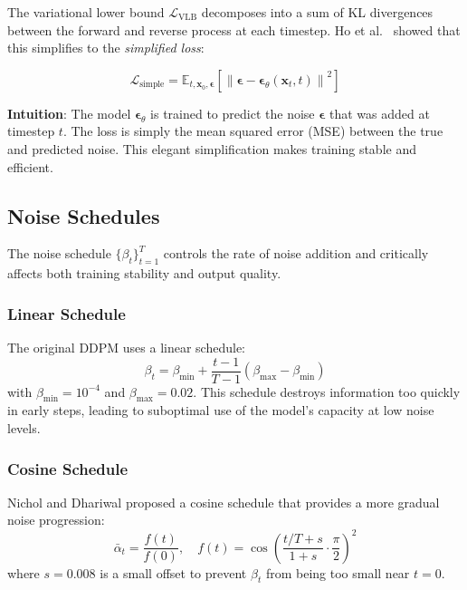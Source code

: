 \documentclass[conference]{IEEEtran}
\begin{document}
The variational lower bound $\mathcal{L}_{\text{VLB}}$ decomposes into a sum of KL divergences between the forward and reverse process at each timestep. Ho et al.\ \cite{ho2020ddpm} showed that this simplifies to the \textit{simplified loss}:

\begin{equation}
    \mathcal{L}_{\text{simple}} = \mathbb{E}_{t, \mathbf{x}_0, \boldsymbol{\epsilon}}\left[\left\| \boldsymbol{\epsilon} - \boldsymbol{\epsilon}_\theta(\mathbf{x}_t, t) \right\|^2\right]
    \label{eq:loss_simple}
\end{equation}

\textbf{Intuition}: The model $\boldsymbol{\epsilon}_\theta$ is trained to predict the noise $\boldsymbol{\epsilon}$ that was added at timestep $t$. The loss is simply the mean squared error (MSE) between the true and predicted noise. This elegant simplification makes training stable and efficient.

\subsection{Noise Schedules}

The noise schedule $\{\beta_t\}_{t=1}^T$ controls the rate of noise addition and critically affects both training stability and output quality.

\subsubsection{Linear Schedule}
The original DDPM \cite{ho2020ddpm} uses a linear schedule:
\begin{equation}
    \beta_t = \beta_{\min} + \frac{t - 1}{T - 1}(\beta_{\max} - \beta_{\min})
    \label{eq:linear_schedule}
\end{equation}
with $\beta_{\min} = 10^{-4}$ and $\beta_{\max} = 0.02$. This schedule destroys information too quickly in early steps, leading to suboptimal use of the model's capacity at low noise levels.

\subsubsection{Cosine Schedule}
Nichol and Dhariwal \cite{nichol2021improved} proposed a cosine schedule that provides a more gradual noise progression:
\begin{equation}
    \bar{\alpha}_t = \frac{f(t)}{f(0)}, \quad f(t) = \cos\left(\frac{t/T + s}{1 + s} \cdot \frac{\pi}{2}\right)^2
    \label{eq:cosine_schedule}
\end{equation}
where $s = 0.008$ is a small offset to prevent $\beta_t$ from being too small near $t = 0$.
\end{document}
